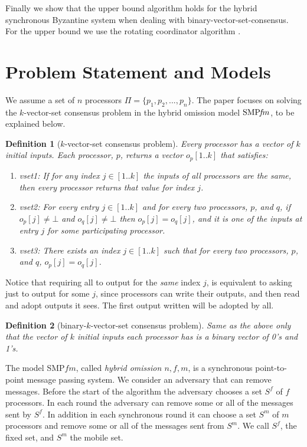\documentclass[11pt]{article}
\newtheorem{definition}{Definition}
\newcommand{\SMPfm}{\mbox{SMP\!$f\!m$}\xspace}
\def\beginsmall#1{\vspace{-\parskip}\begin{#1}\itemsep-\parskip}
\def\endsmall#1{\end{#1}\vspace{-\parskip}}
\begin{document}
Finally we show that the upper bound algorithm holds for the hybrid synchronous Byzantine system
when dealing with binary-vector-set-consensus. 
For the upper bound we use the rotating coordinator algorithm \cite{Reischuk198523,Chandra:1991:TME:112007.112027}.




\section{Problem Statement and Models}
We assume a set of $n$ processors 
$\Pi=\{p_1, p_2, ..., p_n\}$. 
The paper focuses on solving the $k$-vector-set consensus problem in the hybrid omission model $\SMPfm$, to be explained below.



\begin{definition}[$k$-vector-set consensus problem]
Every processor has a vector of $k$ initial inputs. Each processor, $p$, returns a vector $o_p[1..k]$ that satisfies:
\beginsmall{enumerate}
\item[\textup{ vset1:}] If for any index $j\in[1..k]$ the inputs of all processors are the same, then every processor returns  that value for index $j$.
\item[\textup{ vset2:}] For every entry $j\in[1..k]$ and for every two processors, $p$, and  $q$,  if $o_p[j]\not=\bot$ and $o_q[j]\not=\bot$ then $o_p[j]=o_q[j]$,
and it is one of the inputs at entry $j$ for some participating processor.
\item[\textup{ vset3:}] There exists an index $j\in[1..k]$ such that for every two processors, $p$, and  $q$,   $o_p[j]=o_q[j]$.
\endsmall{enumerate}
\end{definition}

Notice that requiring all to output for the \emph{same} index $j$, is equivalent to asking just to output for some $j$, since processors
can write their outputs, and then read and adopt outputs it sees. The first output written will be adopted by all.

\begin{definition}[binary-$k$-vector-set consensus problem]
Same as the above only that the vector of $k$ initial inputs each processor has is a binary vector of 0's and 1's.
\end{definition}



The model \SMPfm, called \emph{hybrid omission $n,f,m$}, is a synchronous point-to-point message passing system.
We consider an adversary that can remove messages.
Before the start of the algorithm the adversary chooses a set $S^f$ of $f$ processors.
In each round the adversary can remove some or all of the messages sent by $S^f$.
In addition in each synchronous round it can choose a set $S^m$ of $m$ processors and remove some 
or all of the messages sent from $S^m$.
We call $S^f$, the fixed set, and $S^m$ the mobile set.
\end{document}
